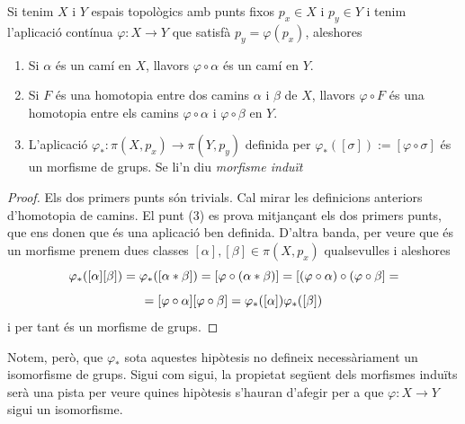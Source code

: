 \documentclass[../main.tex]{subfiles}
\begin{document}
\begin{prop}
\label{prop:morfismegrupfonamental} Si tenim $X$ i $Y$ espais topològics amb punts fixos $p_x\in X$ i $p_y\in Y$ i tenim l'aplicació contínua $\varphi:X\rightarrow Y$ que satisfà $p_y = \varphi(p_x)$, aleshores
\begin{enumerate}[(1)]
    \item Si $\alpha$ és un camí en $X$, llavors $\varphi\circ\alpha$ és un camí en $Y$.
    \item Si $F$ és una homotopia entre dos camins $\alpha$ i $\beta$ de $X$, llavors $\varphi\circ F$ és una homotopia entre els camins $\varphi\circ\alpha$ i $\varphi\circ\beta$ en $Y$.
    \item L'aplicació $\varphi_*:\pi(X,p_x)\rightarrow \pi(Y,p_y)$ definida per $\varphi_*([\sigma]):=[\varphi\circ\sigma]$ és un morfisme de grups. Se li'n diu \textit{morfisme induït}
\end{enumerate}
\end{prop}
\begin{proof}
Els dos primers punts són trivials. Cal mirar les definicions anteriors d'homotopia de camins. El punt (3) es prova mitjançant els dos primers punts, que ens donen que és una aplicació ben definida. D'altra banda, per veure que és un morfisme prenem dues classes $[\alpha],[\beta]\in\pi(X,p_x)$ qualsevulles i aleshores
\begin{equation}
    \notag
    \varphi_*([\alpha][\beta]) = \varphi_*([\alpha*\beta]) = [\varphi\circ(\alpha*\beta)] = [(\varphi\circ\alpha)\circ(\varphi\circ\beta] =
\end{equation}
\begin{equation}
    \notag
    =[\varphi\circ\alpha][\varphi\circ\beta] = \varphi_*([\alpha])\varphi_*([\beta])
\end{equation}
i per tant és un morfisme de grups.
\end{proof}

Notem, però, que $\varphi_*$ sota aquestes hipòtesis no defineix necessàriament un isomorfisme de grups. Sigui com sigui, la propietat següent dels morfismes induïts serà una pista per veure quines hipòtesis s'hauran d'afegir per a que $\varphi:X\rightarrow Y$ sigui un isomorfisme.
\end{document}
